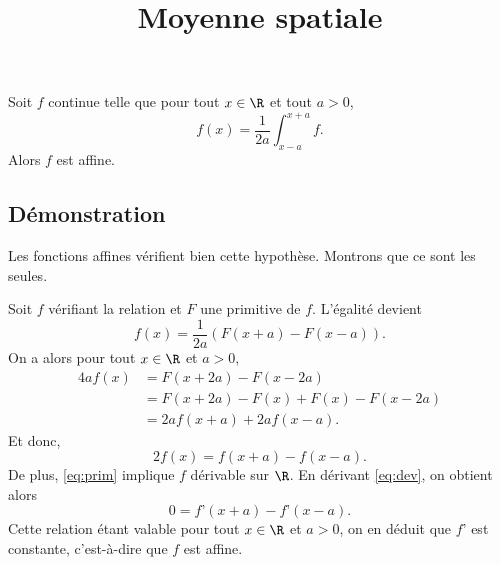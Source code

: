 \documentclass[fontsize=12pt,twoside=false,parskip=half]{scrartcl}
\title{Moyenne spatiale}
\date{}
\author{}
\begin{document}
\maketitle
   \begin{Theoreme}
      Soit $f$ continue telle que pour tout $x \in \R$ et tout $a > 0$,
      \[
         f(x) = \frac{1}{2a}\int_{x - a}^{x + a} f.
      \]
      Alors $f$ est affine.
   \end{Theoreme}
   \subsection{Démonstration}
      Les fonctions affines vérifient bien cette hypothèse. Montrons que ce sont les seules.
      
      Soit $f$ vérifiant la relation et $F$ une primitive de $f$. L’égalité devient
      \begin{equation}
         f(x) = \frac{1}{2a} (F(x + a) - F(x - a)). \label{eq:prim}
      \end{equation}
      On a alors pour tout $x \in \R$ et $a > 0$,
      \begin{align*}
         4af(x) &= F(x + 2a) - F(x - 2a)\\
                &= F(x + 2a) - F(x) + F(x) - F(x - 2a)\\
                &= 2af(x + a) + 2af(x - a).
      \end{align*}
      Et donc,
      \begin{equation}
         2f(x) = f(x + a) - f(x - a). \label{eq:dev}
      \end{equation}
      De plus, \eqref{eq:prim} implique $f$ dérivable sur $\R$. En dérivant \eqref{eq:dev}, on obtient alors
     \[
         0 = f’(x + a) - f’(x - a).
     \]
     Cette relation étant valable pour tout $x \in \R$ et $a > 0$, on en déduit que $f’$ est constante,
     c’est-à-dire que $f$ est affine.
\end{document}
